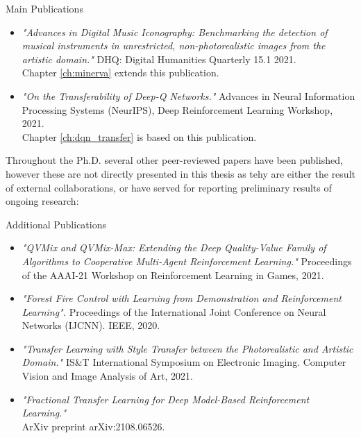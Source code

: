 \begin{remark}{Main Publications}
\begin{itemize}
	\item \citet{sabatelli2021advances} \textit{"Advances in Digital Music Iconography: Benchmarking the detection of musical instruments in unrestricted, non-photorealistic images from the artistic domain."} DHQ: Digital Humanities Quarterly 15.1 2021.
	\\ Chapter \ref{ch:minerva} extends this publication.

	\item \citet{sabatelli2021transferability} \textit{"On the Transferability of Deep-Q Networks."} Advances in Neural Information Processing Systems (NeurIPS), Deep Reinforcement Learning Workshop, 2021. \\
	Chapter \ref{ch:dqn_transfer} is based on this publication.
 
\end{itemize}
\end{remark}

Throughout the Ph.D. several other peer-reviewed papers have been published, however these are not directly presented in this thesis as tehy are either the result of external collaborations, or have served for reporting preliminary results of ongoing research:

\begin{takeaway}{Additional Publications}
\begin{itemize}
	\item \citet{leroy21qvmix} \textit{"QVMix and QVMix-Max: Extending the Deep Quality-Value Family of Algorithms to Cooperative Multi-Agent Reinforcement Learning."} Proceedings of the AAAI-21 Workshop on Reinforcement Learning in Games, 2021. 
	\item \citet{hammond2020forest} \textit{"Forest Fire Control with Learning from Demonstration and Reinforcement Learning".} Proceedings of the International Joint Conference on Neural Networks (IJCNN). IEEE, 2020.
	\item \citet{banartransfer} \textit{"Transfer Learning with Style Transfer between the Photorealistic and Artistic Domain."} IS\&T International Symposium on Electronic Imaging. Computer Vision and Image Analysis of Art, 2021.
	\item \citet{sasso2021fractional} \textit{"Fractional Transfer Learning for Deep Model-Based Reinforcement Learning."} \\ ArXiv preprint arXiv:2108.06526. 

\end{itemize}
\end{takeaway}
